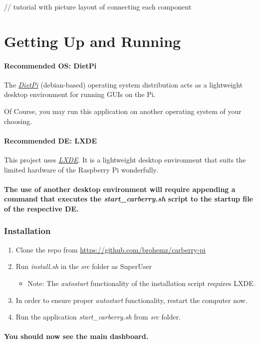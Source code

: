 \documentclass{article}
\begin{document}
// tutorial with picture layout of connecting each component

\hypertarget{getting-up-and-running}{%
\section{Getting Up and Running}\label{getting-up-and-running}}

\hypertarget{recommended-os-dietpi}{%
\paragraph{Recommended OS: DietPi}\label{recommended-os-dietpi}}

The \href{https://dietpi.com}{\emph{DietPi}} (debian-based) operating system distribution acts as a
lightweight desktop environment for running GUIs on the Pi.

\begin{flushleft}
Of Course, you may run this application on another operating system of
your choosing.
\end{flushleft}



\hypertarget{recommended-de-lxde}{%
\paragraph{Recommended DE: LXDE}\label{recommended-de-lxde}}
This project uses \href{https://wiki.lxde.org/en/Main_Page}{\emph{LXDE}}. It is a lightweight desktop environment
that suits the limited hardware of the Raspberry Pi wonderfully.


\paragraph{The use of another desktop environment will require appending a
command that executes the \emph{start\_carberry.sh} script to the
startup file of the respective DE.}

\subsubsection{Installation}
\begin{enumerate}
    \def\labelenumi{\arabic{enumi}.}
    \item   Clone the repo from \url{https://github.com/brohemz/carberry-pi}
    \item   Run \emph{install.sh} in the \emph{src} folder as SuperUser
    \begin{itemize}
        \item Note: The \emph{autostart} functionality of the installation script
                    requires LXDE.
    \end{itemize}
    \item In order to ensure proper \emph{autostart} functionality, restart the computer now.
    \item Run the application \emph{start\_carberry.sh} from \emph{src} folder.
\end{enumerate}
\paragraph{You should now see the main dashboard.}
\end{document}
